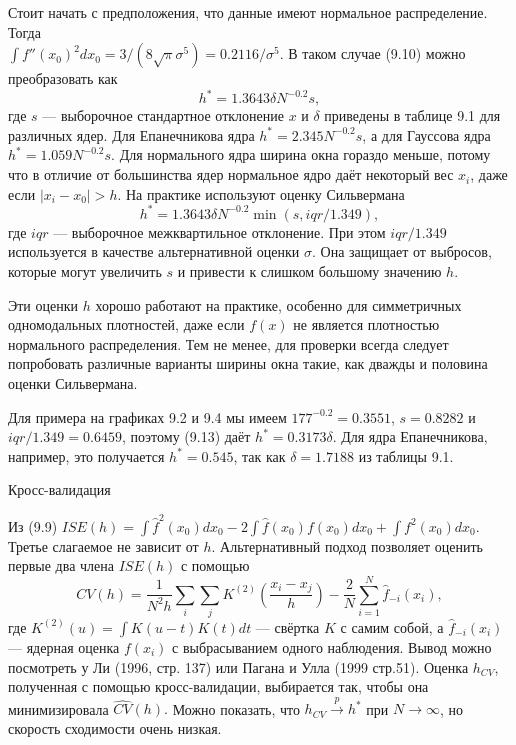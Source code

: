 Стоит начать с предположения, что данные имеют нормальное распределение. Тогда  \\ $\int f''(x_0)^2dx_0 = 3/(8\sqrt{\pi}\sigma^5) = 0.2116/\sigma^5$. В таком случае (9.10) можно преобразовать как
\begin{equation}
h^* = 1.3643\delta N^{-0.2}s,
\end{equation}
где $s$ --- выборочное стандартное отклонение $x$ и $\delta$ приведены в таблице 9.1 для различных ядер. Для Епанечникова ядра $h^* = 2.345N^{-0.2}s$, а для Гауссова ядра $h^* = 1.059N^{-0.2}s$. Для нормального ядра ширина окна гораздо меньше, потому что в отличие от большинства ядер нормальное ядро даёт некоторый вес $x_i$, даже если $|x_i - x_0| > h$. На практике используют оценку Сильвермана
\begin{equation}
h^* = 1.3643\delta N^{-0.2}\min(s,iqr/1.349),
\end{equation}
где $iqr$ --- выборочное межквартильное отклонение. При этом $iqr/1.349$ используется в качестве альтернативной оценки $\sigma$. Она защищает от выбросов, которые могут увеличить $s$ и привести к слишком большому значению $h$.

Эти оценки $h$ хорошо работают на практике, особенно для симметричных одномодальных плотностей, даже если $f(x)$ не является плотностью нормального распределения. Тем не менее, для проверки всегда следует попробовать различные варианты ширины окна такие, как дважды и половина оценки Сильвермана.

Для примера на графиках 9.2 и 9.4 мы имеем $177^{-0.2} = 0.3551$, $s = 0.8282$ и $iqr/1.349 = 0.6459$, поэтому (9.13) даёт $h^* = 0.3173\delta$. Для ядра Епанечникова, например, это получается $h^* = 0.545$, так как $\delta = 1.7188$ из таблицы 9.1.

\begin{center}
Кросс-валидация
\end{center}

Из (9.9) $ISE(h) = \int \hat{f}^2(x_0)dx_0 - 2\int \hat{f}(x_0)f(x_0)dx_0 + \int f^2(x_0)dx_0$. Третье слагаемое не зависит от $h$. Альтернативный подход позволяет оценить первые два члена $ISE(h)$ с помощью
\begin{equation}
CV(h) = \frac{1}{N^2h} \sum_i \sum_j K^{(2)} \left( \frac{x_i - x_j}{h} \right) - \frac{2}{N} \sum_{i=1}^N \hat{f}_{-i}(x_i),
\end{equation}
где $K^{(2)}(u) = \int K(u - t)K(t)dt$ --- свёртка $K$ с самим собой, а $\hat{f}_{-i}(x_i)$ --- ядерная оценка $f(x_i)$ с выбрасыванием одного наблюдения. Вывод можно посмотреть у Ли (1996, стр. 137) или Пагана и Улла (1999 стр.51). Оценка $h_{CV}$, полученная с помощью кросс-валидации, выбирается так, чтобы она минимизировала $\widehat{CV}(h).$ Можно показать, что $h_{CV} \stackrel{p}{\rightarrow} h^*$ при $N \rightarrow \infty$, но скорость сходимости очень низкая.

